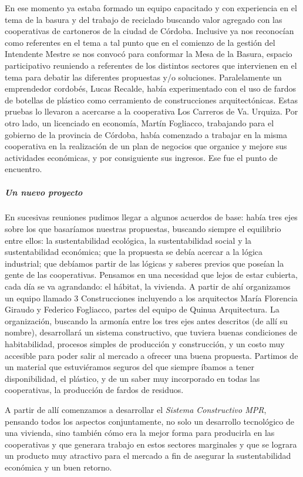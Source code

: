 \documentclass[
]{article}
\begin{document}
En ese momento ya estaba formado un equipo capacitado y con experiencia
en el tema de la basura y del trabajo de reciclado buscando valor
agregado con las cooperativas de cartoneros de la ciudad de Córdoba.
Inclusive ya nos reconocían como referentes en el tema a tal punto que
en el comienzo de la gestión del Intendente Mestre se nos convocó para
conformar la Mesa de la Basura, espacio participativo reuniendo a
referentes de los distintos sectores que intervienen en el tema para
debatir las diferentes propuestas y/o soluciones. Paralelamente un
emprendedor cordobés, Lucas Recalde, había experimentado con el uso de
fardos de botellas de plástico como cerramiento de construcciones
arquitectónicas. Estas pruebas lo llevaron a acercarse a la cooperativa
Los Carreros de Va. Urquiza. Por otro lado, un licenciado en economía,
Martín Fogliacco, trabajando para el gobierno de la provincia de
Córdoba, había comenzado a trabajar en la misma cooperativa en la
realización de un plan de negocios que organice y mejore sus actividades
económicas, y por consiguiente sus ingresos. Ese fue el punto de
encuentro.

\hypertarget{un-nuevo-proyecto}{%
\subparagraph{Un nuevo proyecto}\label{un-nuevo-proyecto}}

En sucesivas reuniones pudimos llegar a algunos acuerdos de base: había
tres ejes sobre los que basaríamos nuestras propuestas, buscando siempre
el equilibrio entre ellos: la sustentabilidad ecológica, la
sustentabilidad social y la sustentabilidad económica; que la propuesta
se debía acercar a la lógica industrial; que debíamos partir de las
lógicas y saberes previos que poseían la gente de las cooperativas.
Pensamos en una necesidad que lejos de estar cubierta, cada día se va
agrandando: el hábitat, la vivienda. A partir de ahí organizamos un
equipo llamado 3 Construcciones incluyendo a los arquitectos María
Florencia Giraudo y Federico Fogliacco, partes del equipo de Quinua
Arquitectura. La organización, buscando la armonía entre los tres ejes
antes descritos (de allí su nombre), desarrollará un sistema
constructivo, que tuviera buenas condiciones de habitabilidad, procesos
simples de producción y construcción, y un costo muy accesible para
poder salir al mercado a ofrecer una buena propuesta. Partimos de un
material que estuviéramos seguros del que siempre íbamos a tener
disponibilidad, el plástico, y de un saber muy incorporado en todas las
cooperativas, la producción de fardos de residuos.

A partir de allí comenzamos a desarrollar el \emph{Sistema Constructivo
MPR}, pensando todos los aspectos conjuntamente, no solo un desarrollo
tecnológico de una vivienda, sino también cómo era la mejor forma para
producirla en las cooperativas y que generara trabajo en estos sectores
marginales y que se lograra un producto muy atractivo para el mercado a
fin de asegurar la sustentabilidad económica y un buen retorno.
\end{document}
